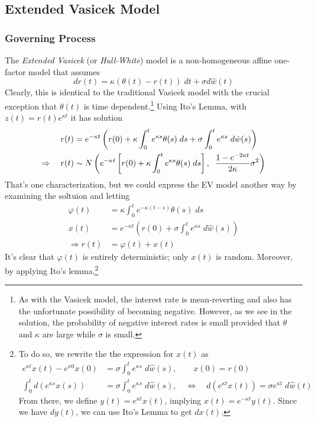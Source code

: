 \documentclass[a4paper,12pt]{scrartcl}
\begin{document}
\newpage
\subsection{Extended Vasicek Model}

\subsubsection{Governing Process}
The \emph{Extended Vasicek} (or \emph{Hull-White}) model is a 
non-homogeneous affine one-factor model that assumes
\begin{equation}
   dr(t) = \kappa(\theta(t) - r(t))\; dt + \sigma d\hat{w}(t)
\end{equation}
Clearly, this is identical to the traditional Vasicek model with
the crucial exception that $\theta(t)$ is time dependent.\footnote{As
with the Vasicek model, the interest rate is mean-reverting and 
also has the unfortunate possibility of becoming negative. However,
as we see in the solution, the probability of negative interest
rates is small provided that $\theta$ and $\kappa$ are large
while $\sigma$ is small.}
Using Ito's Lemma, with $z(t) =r(t) e^{\kappa t}$ it has solution
\begin{align}
   \label{evsol}
   r(t) &= e^{-\kappa t} \left( r(0) + \kappa \int^t_0 e^{\kappa s}
      \theta(s) \; ds + \sigma \int^t_0 e^{\kappa s} \; d\hat{w}(s) 
      \right) \notag\\
   \Rightarrow \quad r(t) &\sim N\left(e^{-\kappa t} \left[ r(0)
      + \kappa \int^t_0 e^{\kappa s} \theta(s) \; ds\right],
      \; \; \frac{1-e^{-2\kappa t}}{2\kappa} \sigma^2 \right)
\end{align}
That's one characterization, but we could express the EV model another
way by examining the soltuion and letting 
\begin{align*}
   \varphi(t) &= \kappa \int^t_0 e^{-\kappa (t-s)} \theta(s) \; ds\\
   x(t) &= e^{-\kappa t} \left(r(0) + \sigma \int^t_0 e^{\kappa s}
   \; d\hat{w}(s) \right)\\
   \Rightarrow r(t) &= \varphi(t) + x(t)
\end{align*}
It's clear that $\varphi(t)$ is entirely deterministic; only 
$x(t)$ is random.  Moreover, by applying Ito's lemma,\footnote{To do
so, we rewrite the the expression for $x(t)$ as 
\begin{align*}
   e^{\kappa t} x(t) - e^{\kappa 0} x(0) &= \sigma \int^t_0 e^{\kappa s}
      \; d\hat{w}(s), \qquad x(0) = r(0) \\
   \int^t_0 d\left(e^{\kappa s} x(s)\right) &= \sigma 
      \int^t_0 e^{\kappa s} \; d\hat{w}(s), \quad \Leftrightarrow
      \quad d\left(e^{\kappa t} x(t)\right) = \sigma 
      e^{\kappa t} \; d\hat{w}(t)
\end{align*}  
From there, we define $y(t) = e^{\kappa t} x(t)$, implying $x(t) =
e^{-\kappa t} y(t)$. Since we have $dy(t)$, we can use Ito's Lemma to get $dx(t)$.}
\end{document}
